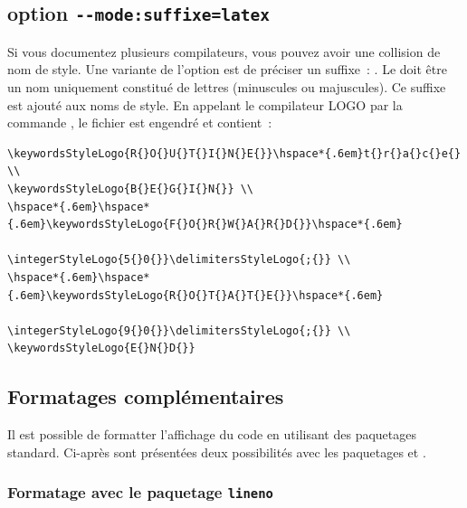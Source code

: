 \subsection{option \texttt{-{}-mode{}:suffixe=latex}}

Si vous documentez plusieurs compilateurs, vous pouvez avoir une collision de nom de style. Une variante de l'option  est de préciser un suffixe~: . Le  doit être un nom uniquement constitué de lettres (minuscules ou majuscules). Ce suffixe est ajouté aux noms de style. En appelant le compilateur LOGO par la commande , le fichier  est engendré et contient~:

{\small
\begin{verbatim}
\keywordsStyleLogo{R{}O{}U{}T{}I{}N{}E{}}\hspace*{.6em}t{}r{}a{}c{}e{} \\
\keywordsStyleLogo{B{}E{}G{}I{}N{}} \\
\hspace*{.6em}\hspace*{.6em}\keywordsStyleLogo{F{}O{}R{}W{}A{}R{}D{}}\hspace*{.6em}
                              \integerStyleLogo{5{}0{}}\delimitersStyleLogo{;{}} \\
\hspace*{.6em}\hspace*{.6em}\keywordsStyleLogo{R{}O{}T{}A{}T{}E{}}\hspace*{.6em}
                              \integerStyleLogo{9{}0{}}\delimitersStyleLogo{;{}} \\
\keywordsStyleLogo{E{}N{}D{}}
\end{verbatim}
}



\subsection{Formatages complémentaires}

Il est possible de formatter l'affichage du code en utilisant des paquetages standard. Ci-après sont présentées deux possibilités avec les paquetages  et .

\subsubsection{Formatage avec le paquetage \texttt{lineno}}

